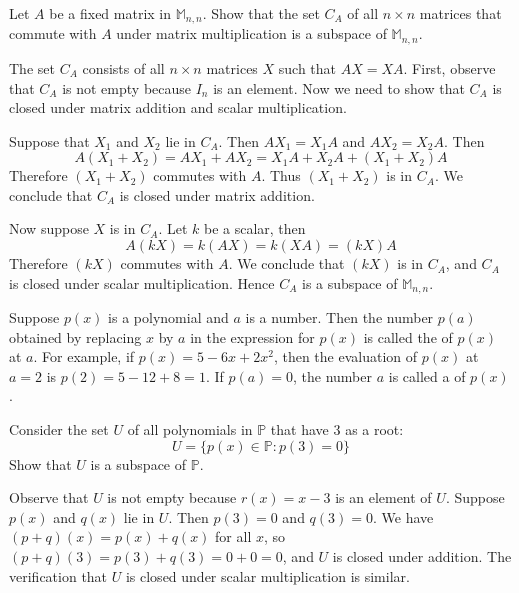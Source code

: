 \documentclass{ximera}
\begin{document}
\begin{example}\label{ex:centralizerofA}
Let $A$ be a fixed matrix in $\mathbb{M}_{n,n}$. Show that the set $C_A$ of all $n\times n$ matrices that commute with $A$ under matrix multiplication  is a subspace of $\mathbb{M}_{n,n}$.  

\begin{explanation}
The set $C_A$ consists of all $n\times n$ matrices $X$ such that $AX=XA$.  First, observe that $C_A$ is not empty because $I_n$ is an element.  Now we need to show that $C_A$ is closed under matrix addition and scalar multiplication.

Suppose that $X_1$ and $X_{2}$ lie in $C_A$.  Then $AX_1 = X_1A$ and $AX_{2} = X_{2}A$. Then
$$
A(X_1 + X_2) 	= AX_1 + AX_2 = X_1A + X_2A + (X_1 + X_2)A $$
Therefore $(X_1+X_2)$ commutes with $A$.  Thus $(X_1+X_2)$ is in $C_A$.  We conclude that $C_A$ is closed under matrix addition.

Now suppose $X$ is in $C_A$.  Let $k$ be a scalar, then
$$
A(kX)= k(AX) = k(XA) = (kX)A
$$
Therefore $(kX)$ commutes with $A$.  We conclude that $(kX)$ is in $C_A$, and $C_A$ is closed under scalar multiplication.
 Hence $C_A$ is a subspace of $\mathbb{M}_{n,n}$.
\end{explanation}
\end{example}

Suppose $p(x)$ is a polynomial and $a$ is a number. Then the number $p(a)$ obtained by replacing $x$ by $a$ in the expression for $p(x)$ is called the  of $p(x)$ at $a$. For example, if $p(x) = 5 - 6x + 2x^{2}$, then the evaluation of $p(x)$ at $a = 2$ is $p(2) = 5 - 12 + 8 = 1$. If $p(a) = 0$, the number $a$ is called a  of $p(x)$.

\begin{example}\label{ex:root3}
Consider the set $U$ of all polynomials in $\mathbb{P}$ that have $3$ as a root:
\begin{equation*}
U = \{p(x) \in \mathbb{P} : p(3) = 0 \}
\end{equation*}
Show that $U$ is a subspace of $\mathbb{P}$.

\begin{explanation}
  Observe that $U$ is not empty because $r(x)=x-3$ is an element of $U$.  Suppose $p(x)$ and $q(x)$ lie in $U$.  Then $p(3) = 0$ and $q(3) = 0$. We have $(p + q)(x) = p(x) + q(x)$ for all $x$, so $(p + q)(3) = p(3) + q(3) = 0 + 0 = 0$, and $U$ is closed under addition. The verification that $U$ is closed under scalar multiplication is similar.
\end{explanation}
\end{example}
\end{document}

